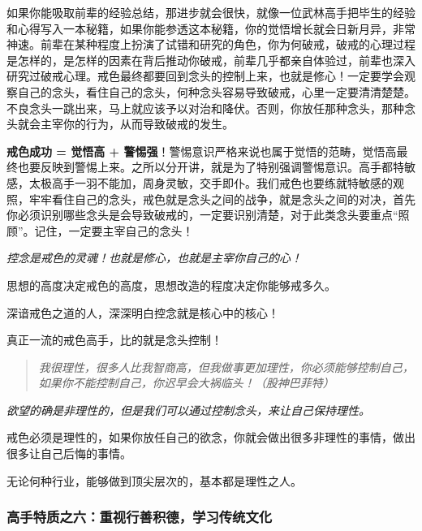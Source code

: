 如果你能吸取前辈的经验总结，那进步就会很快，就像一位武林高手把毕生的经验和心得写入一本秘籍，如果你能参透这本秘籍，你的觉悟增长就会日新月异，非常神速。前辈在某种程度上扮演了试错和研究的角色，你为何破戒，破戒的心理过程是怎样的，是怎样的因素在背后推动你破戒，前辈几乎都亲自体验过，前辈也深入研究过破戒心理。戒色最终都要回到念头的控制上来，也就是修心！一定要学会观察自己的念头，看住自己的念头，何种念头容易导致破戒，心里一定要清清楚楚。不良念头一跳出来，马上就应该予以对治和降伏。否则，你放任那种念头，那种念头就会主宰你的行为，从而导致破戒的发生。

\textbf{戒色成功 = 觉悟高 + 警惕强}！警惕意识严格来说也属于觉悟的范畴，觉悟高最终也要反映到警惕上来。之所以分开讲，就是为了特别强调警惕意识。高手都特敏感，太极高手一羽不能加，周身灵敏，交手即仆。我们戒色也要练就特敏感的观照，牢牢看住自己的念头，戒色就是念头之间的战争，就是念头之间的对决，首先你必须识别哪些念头是会导致破戒的，一定要识别清楚，对于此类念头要重点“照顾”。记住，一定要主宰自己的念头！

{\it 控念是戒色的灵魂！也就是修心，也就是主宰你自己的心！

思想的高度决定戒色的高度，思想改造的程度决定你能够戒多久。

深谙戒色之道的人，深深明白控念就是核心中的核心！

真正一流的戒色高手，比的就是念头控制！}

\begin{quote}\it
    我很理性，很多人比我智商高，但我做事更加理性，你必须能够控制自己，如果你不能控制自己，你迟早会大祸临头！（股神巴菲特）
\end{quote}

{\it 欲望的确是非理性的，但是我们可以通过控制念头，来让自己保持理性。

戒色必须是理性的，如果你放任自己的欲念，你就会做出很多非理性的事情，做出很多让自己后悔的事情。

无论何种行业，能够做到顶尖层次的，基本都是理性之人。}

\subsubsection{高手特质之六：重视行善积德，学习传统文化}

